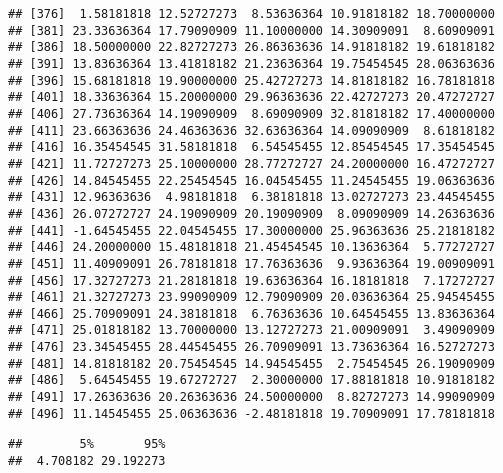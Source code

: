 \documentclass[]{book}
\newenvironment{Shaded}{\begin{snugshade}}{\end{snugshade}}
\newcommand{\CommentTok}[1]{\textcolor[rgb]{0.56,0.35,0.01}{\textit{#1}}}
\newcommand{\FloatTok}[1]{\textcolor[rgb]{0.00,0.00,0.81}{#1}}
\newcommand{\KeywordTok}[1]{\textcolor[rgb]{0.13,0.29,0.53}{\textbf{#1}}}
\newcommand{\NormalTok}[1]{#1}
\begin{document}
\begin{verbatim}
## [376]  1.58181818 12.52727273  8.53636364 10.91818182 18.70000000
## [381] 23.33636364 17.79090909 11.10000000 14.30909091  8.60909091
## [386] 18.50000000 22.82727273 26.86363636 14.91818182 19.61818182
## [391] 13.83636364 13.41818182 21.23636364 19.75454545 28.06363636
## [396] 15.68181818 19.90000000 25.42727273 14.81818182 16.78181818
## [401] 18.33636364 15.20000000 29.96363636 22.42727273 20.47272727
## [406] 27.73636364 14.19090909  8.69090909 32.81818182 17.40000000
## [411] 23.66363636 24.46363636 32.63636364 14.09090909  8.61818182
## [416] 16.35454545 31.58181818  6.54545455 12.85454545 17.35454545
## [421] 11.72727273 25.10000000 28.77272727 24.20000000 16.47272727
## [426] 14.84545455 22.25454545 16.04545455 11.24545455 19.06363636
## [431] 12.96363636  4.98181818  6.38181818 13.02727273 23.44545455
## [436] 26.07272727 24.19090909 20.19090909  8.09090909 14.26363636
## [441] -1.64545455 22.04545455 17.30000000 25.96363636 25.21818182
## [446] 24.20000000 15.48181818 21.45454545 10.13636364  5.77272727
## [451] 11.40909091 26.78181818 17.76363636  9.93636364 19.00909091
## [456] 17.32727273 21.28181818 19.63636364 16.18181818  7.17272727
## [461] 21.32727273 23.99090909 12.79090909 20.03636364 25.94545455
## [466] 25.70909091 24.38181818  6.76363636 10.64545455 13.83636364
## [471] 25.01818182 13.70000000 13.12727273 21.00909091  3.49090909
## [476] 23.34545455 28.44545455 26.70909091 13.73636364 16.52727273
## [481] 14.81818182 20.75454545 14.94545455  2.75454545 26.19090909
## [486]  5.64545455 19.67272727  2.30000000 17.88181818 10.91818182
## [491] 17.26363636 20.26363636 24.50000000  8.82727273 14.99090909
## [496] 11.14545455 25.06363636 -2.48181818 19.70909091 17.78181818
\end{verbatim}

\begin{Shaded}
\end{Shaded}

\begin{verbatim}
##        5%       95% 
##  4.708182 29.192273
\end{verbatim}

\begin{Shaded}
\end{Shaded}
\end{document}
